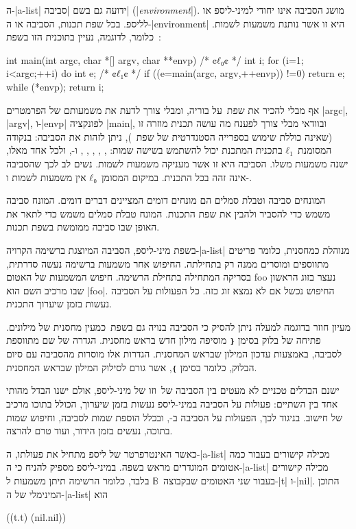 ה-\E|a-list| ידועה גם בשם \ע|סביבה| (\E|\emph{environment}|). מושג הסביבה אינו
יחודי למיני-ליספ או לליספ. בכל שפת תכנות, הסביבה או ה-\E|environment| היא זו
אשר נותנת משמעות לשמות. כלומר, לדוגמה, נעיין בתוכנית הזו בשפת~\CPL:
\begin{CPP}
int main(int argc, char *[] argv, char **envp) {
  /* ¢$ℓ₀$¢ */ int i;
  for (i=1; i<argc;++i) {
    do {
      int e;
      /* ¢$ℓ₁$¢ */ if ((e=main(argc, argv,++envp)) !=0)
        return e;
    } while (*envp);
  }
  return i;
}
\end{CPP}
אף מבלי להכיר את שפת~\CPL על בוריה, ומבלי צורך לדעת את משמעותם של הפרמטרים
\E|argc|, \E|argv|, ו-\E|envp| לפונקציה \E|main|, ובוודאי מבלי צורך לפענח מה
עושה תכנית מוזרה זו (שאינה כוללת שימוש בספרייה הסטנדרטית של שפת~\CPL), ניתן
לזהות את הסביבה: בנקודה המסומנת~$ℓ₁$ בתכנית המתכנת יכול להשתמש בשישה שמות:
, , , , , ו-, ולכל
אחד מאלו, ישנה משמעות משלו. הסביבה היא זו אשר מעניקה משמעות לשמות.
נשים לב לכך שהסביבה אינה זהה בכל התכנית. במיקום המסומן~$ℓ₀$ אין משמעות
לשמות  ו-.

המונחים סביבה וטבלת סמלים הם מונחים דומים המציינים דברים דומים. המונח סביבה
משמש כדי להסביר ולהבין את שפת התכנות. המונח טבלת סמלים משמש כדי לתאר את האופן שבו
סביבה ממומשת בשפת תכנות.

בשפת מיני-ליספ, הסביבה המיוצגת ברשימה הקרויה-\E|a-list| מנוהלת כמחסנית, כלומר
פריטים מתווספים ומוסרים ממנה רק בתחילתה. החיפוש אחר משמעות ברשימה נעשה סדרתית,
בסריקה המתחילה בתחילת הרשימה. חיפוש המשמעות של האטום foo נעצר בזוג הראשון שבו
מרכיב השם הוא \E|foo|. החיפוש נכשל אם לא נמצא זוג כזה. כל הפעולות על הסביבה
נעשות בזמן שיערוך התכנית.

מעיון חוזר בדוגמה למעלה ניתן להסיק כי הסביבה בנויה גם בשפת~\CPL כמעין מחסנית
של מילונים. פתיחה של בלוק בסימן \texttt{❴} מוסיפה מילון חדש בראש מחסנית. הגדרה
של שם מתווספת לסביבה, באמצעות עדכון המילון שבראש המחסנית. הגדרות אלו מוסרות
מהסביבה עם סיום הבלוק, כלומר בסימן \texttt{❵}, אשר גורם לסילוק המילון שבראש המחסנית.

ישנם הבדלים טכניים לא מעטים בין הסביבה של~\CPL וזו של מיני-ליספ, אולם ישנו הבדל
מהותי אחד בין השתיים: פעולות על הסביבה במיני-ליספ נעשות בזמן שיערוך, הכולל בתוכו
מרכיב של חישוב. בניגוד לכך, הפעולות על הסביבה ב-\CPL, ובכלל הוספת שמות לסביבה,
וחיפוש שמות בתוכה, נעשים בזמן הידור, ועוד טרם להרצה.

כאשר האינטרפרטר של ליספ מתחיל את פעולתו, ה-\E|a-list| מכילה קישורים בעבור כמה
אטומים המוגדרים מראש בשפה. במיני-ליספ מספיק להניח כי ה-\E|a-list| מכילה קישורים
בעבור שני האטומים שבקבוצה~$𝔹$ בלבד, כלומר הרשימה תיתן משמעות ל-\E|t| ו-\E|nil|.
התוכן המינימלי של ה-\E|a-list| הוא
\begin{LISP}
((t.t)
     (nil.nil))
\end{LISP}

